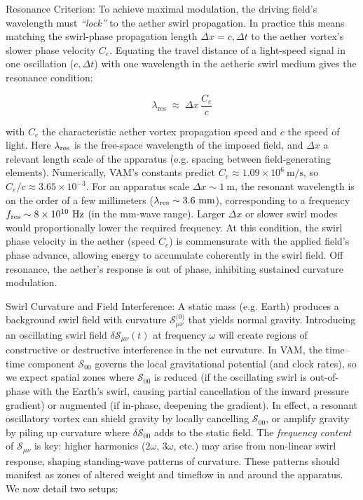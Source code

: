 \documentclass[twocolumn,aps,pre,floatfix,nofootinbib]{revtex4-2}
\begin{document}
Resonance Criterion:  To achieve maximal modulation, the driving field’s wavelength must \textit{“lock”} to the aether swirl propagation. In practice this means matching the swirl-phase propagation length $\Delta x = c,\Delta t$ to the aether vortex’s slower phase velocity $C_e$. Equating the travel distance of a light-speed signal in one oscillation ($c,\Delta t$) with one wavelength in the aetheric swirl medium gives the resonance condition:

\[ \lambda_\textrm{res} \;\approx\; \Delta x \,\frac{C_e}{c} \]



with $C_e$ the characteristic aether vortex propagation speed and $c$ the speed of light. Here $\lambda_{\rm res}$ is the free-space wavelength of the imposed field, and $\Delta x$ a relevant length scale of the apparatus (e.g. spacing between field-generating elements). Numerically, VAM’s constants predict $C_e \approx 1.09\times10^6~\text{m/s}$, so $C_e/c \approx 3.65\times10^{-3}$. For an apparatus scale $\Delta x \sim 1~\text{m}$, the resonant wavelength is on the order of a few millimeters ($\lambda_{\rm res}\sim3.6~\text{mm}$), corresponding to a frequency $f_{\rm res}\sim 8\times10^{10}~\text{Hz}$ (in the mm-wave range). Larger $\Delta x$ or slower swirl modes would proportionally lower the required frequency. At this condition, the swirl phase velocity in the aether (speed $C_e$) is commensurate with the applied field’s phase advance, allowing energy to accumulate coherently in the swirl field. Off resonance, the aether’s response is out of phase, inhibiting sustained curvature modulation.


Swirl Curvature and Field Interference:  A static mass (e.g. Earth) produces a background swirl field with curvature \(\mathcal{S}_{\mu\nu}^{\text{(0)}}\) that yields normal gravity. Introducing an oscillating swirl field $\delta \mathcal{S}_{\mu\nu}(t)$ at frequency $\omega$ will create regions of constructive or destructive interference in the net curvature. In VAM, the time–time component $\mathcal{S}_{\text{00}}$ governs the local gravitational potential (and clock rates), so we expect spatial zones where $\mathcal{S}_{\text{00}}$ is reduced (if the oscillating swirl is out-of-phase with the Earth’s swirl, causing partial cancellation of the inward pressure gradient) or augmented (if in-phase, deepening the gradient). In effect, a resonant oscillatory vortex can shield gravity by locally cancelling $\mathcal{S}_{\text{00}}$, or amplify gravity by piling up curvature where $\delta \mathcal{S}_{\text{00}}$ adds to the static field. The \textit{frequency content} of $\mathcal{S}_{\mu\nu}$ is key: higher harmonics ($2\omega$, $3\omega$, etc.) may arise from non-linear swirl response, shaping standing-wave patterns of curvature. These patterns should manifest as zones of altered weight and timeflow in and around the apparatus. We now detail two setups:
\end{document}
